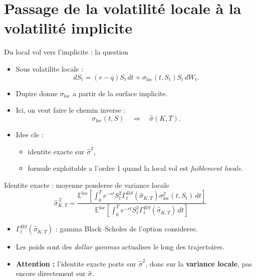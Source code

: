 \section{Passage de la volatilité locale à la volatilité implicite}
\begin{frame}{Du local vol vers l'implicite : la question}
\small
\begin{itemize}
    \item Sous volatilite locale :
    \[
    dS_t=(r-q)S_t\,dt+\sigma_{\mathrm{loc}}(t,S_t)S_t\,dW_t.
    \]
    \item Dupire donne \(\sigma_{\mathrm{loc}}\) a partir de la surface implicite.
    \item Ici, on veut faire le chemin inverse :
    \[
    \sigma_{\mathrm{loc}}(t,S)\quad \Longrightarrow \quad \hat{\sigma}(K,T).
    \]
    \item Idee cle :
    \begin{itemize}
        \item identite exacte sur \(\hat{\sigma}^2\),
        \item formule exploitable a l'ordre 1 quand la local vol est \emph{faiblement locale}.
    \end{itemize}
\end{itemize}
\end{frame}

\begin{frame}{Identite exacte : moyenne ponderee de variance locale}
\small
\[
\hat{\sigma}_{K,T}^{\,2}
=
\frac{
\mathbb{E}^{\mathrm{loc}}\!\left[
\int_0^T e^{-rt} S_t^2 \Gamma_t^{BS}(\hat{\sigma}_{K,T})
\sigma_{\mathrm{loc}}^2(t,S_t)\,dt
\right]
}{
\mathbb{E}^{\mathrm{loc}}\!\left[
\int_0^T e^{-rt} S_t^2 \Gamma_t^{BS}(\hat{\sigma}_{K,T})\,dt
\right]
}
\]

\vspace{0.2cm}
\begin{itemize}
    \item \(\Gamma_t^{BS}(\hat{\sigma}_{K,T})\) : gamma Black--Scholes de l'option consideree.
    \item Les poids sont des \emph{dollar gammas} actualises le long des trajectoires.
    \item \textbf{Attention :} l'identite exacte porte sur \(\hat{\sigma}^2\), donc sur la \textbf{variance locale}, pas encore directement sur \(\hat{\sigma}\).
\end{itemize}
\end{frame}

